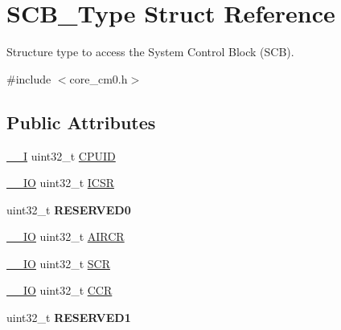 \hypertarget{structSCB__Type}{}\section{S\+C\+B\+\_\+\+Type Struct Reference}
\label{structSCB__Type}


Structure type to access the System Control Block (S\+CB).  




{\ttfamily \#include $<$core\+\_\+cm0.\+h$>$}

\subsection*{Public Attributes}
\begin{DoxyCompactItemize}
\item 
\hyperlink{core__sc300_8h_af63697ed9952cc71e1225efe205f6cd3}{\+\_\+\+\_\+I} uint32\+\_\+t \hyperlink{structSCB__Type_afa7a9ee34dfa1da0b60b4525da285032}{C\+P\+U\+ID}
\item 
\hyperlink{core__sc300_8h_aec43007d9998a0a0e01faede4133d6be}{\+\_\+\+\_\+\+IO} uint32\+\_\+t \hyperlink{structSCB__Type_a3e66570ab689d28aebefa7e84e85dc4a}{I\+C\+SR}
\item 
uint32\+\_\+t {\bfseries R\+E\+S\+E\+R\+V\+E\+D0}\hypertarget{structSCB__Type_a10960cdc703f661c83a237d9c69db23c}{}\label{structSCB__Type_a10960cdc703f661c83a237d9c69db23c}

\item 
\hyperlink{core__sc300_8h_aec43007d9998a0a0e01faede4133d6be}{\+\_\+\+\_\+\+IO} uint32\+\_\+t \hyperlink{structSCB__Type_a6ed3c9064013343ea9fd0a73a734f29d}{A\+I\+R\+CR}
\item 
\hyperlink{core__sc300_8h_aec43007d9998a0a0e01faede4133d6be}{\+\_\+\+\_\+\+IO} uint32\+\_\+t \hyperlink{structSCB__Type_abfad14e7b4534d73d329819625d77a16}{S\+CR}
\item 
\hyperlink{core__sc300_8h_aec43007d9998a0a0e01faede4133d6be}{\+\_\+\+\_\+\+IO} uint32\+\_\+t \hyperlink{structSCB__Type_a6d273c6b90bad15c91dfbbad0f6e92d8}{C\+CR}
\item 
uint32\+\_\+t {\bfseries R\+E\+S\+E\+R\+V\+E\+D1}\hypertarget{structSCB__Type_adddd65958c1c4c0301f62ede0a9bf12e}{}\label{structSCB__Type_adddd65958c1c4c0301f62ede0a9bf12e}


\end{DoxyCompactItemize}
